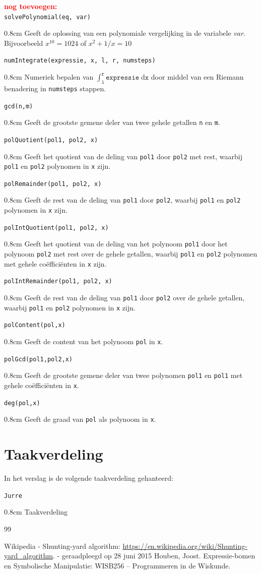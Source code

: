 \documentclass[a4paper]{article}
\newcommand{\rcom}[1]{\textbf{\textcolor{red}{#1}}}
\newcommand{\com}[2]{\texttt{#1}\mbox{}\vspace{-2ex}\begin{adjustwidth}{0.8cm}{} #2 \end{adjustwidth}}
\begin{document}
\rcom{nog toevoegen:\\}
\com{solvePolynomial(eq, var)}{Geeft de oplossing van een polynomiale vergelijking in de variabele \textit{var}. Bijvoorbeeld $x^{10} = 1024$ of $x^2 + 1/x = 10$}
\com{numIntegrate(expressie, x, l, r, numsteps)}{Numeriek bepalen van $\int_{\texttt{l}}^\texttt{r} \texttt{expressie} \; \mathrm{d}\texttt{x}$ door middel van een Riemann benadering in \texttt{numsteps} stappen.}
\com{gcd(n,m)}{Geeft de grootste gemene deler van twee gehele getallen \texttt{n} en \texttt{m}.}
\com{polQuotient(pol1, pol2, x)}{Geeft het quotient van de deling van \texttt{pol1} door \texttt{pol2} met rest, waarbij \texttt{pol1} en \texttt{pol2} polynomen in \texttt{x} zijn.}
\com{polRemainder(pol1, pol2, x)}{Geeft de rest van de deling van \texttt{pol1} door \texttt{pol2}, waarbij \texttt{pol1} en \texttt{pol2} polynomen in \texttt{x} zijn.}
\com{polIntQuotient(pol1, pol2, x)}{Geeft het quotient van de deling van het polynoom \texttt{pol1} door het polynoom \texttt{pol2} met rest over de gehele getallen, waarbij \texttt{pol1} en \texttt{pol2} polynomen met gehele co\"effici\"enten in \texttt{x} zijn.}
\com{polIntRemainder(pol1, pol2, x)}{Geeft de rest van de deling van \texttt{pol1} door \texttt{pol2} over de gehele getallen, waarbij \texttt{pol1} en \texttt{pol2} polynomen in \texttt{x} zijn.}
\com{polContent(pol,x)}{Geeft de content van het polynoom \texttt{pol} in \texttt{x}.}
\com{polGcd(pol1,pol2,x)}{Geeft de grootste gemene deler van twee polynomen \texttt{pol1} en \texttt{pol1} met gehele co\"effici\"enten in \texttt{x}.}
\com{deg(pol,x)}{Geeft de graad van \texttt{pol} als polynoom in \texttt{x}.}

\section{Taakverdeling}
In het verslag is de volgende taakverdeling gehanteerd:

\com{Jurre} {Taakverdeling}




\begin{thebibliography}{99}

 Wikipedia - Shunting-yard algorithm:
\url{https://en.wikipedia.org/wiki/Shunting-yard_algorithm}. 
 - geraadpleegd op 28 juni 2015
  Houben, Joost. Expressie-bomen en Symbolische Manipulatie: WISB256 – Programmeren in de Wiskunde.


\end{thebibliography}
\end{document}
